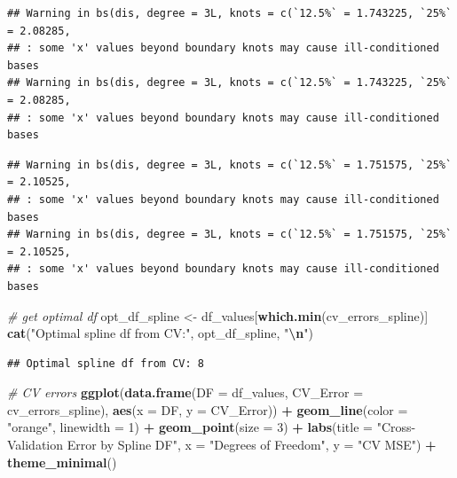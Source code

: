 \documentclass[
]{article}
\newenvironment{Shaded}{\begin{snugshade}}{\end{snugshade}}
\newcommand{\AttributeTok}[1]{\textcolor[rgb]{0.13,0.29,0.53}{#1}}
\newcommand{\CommentTok}[1]{\textcolor[rgb]{0.56,0.35,0.01}{\textit{#1}}}
\newcommand{\DecValTok}[1]{\textcolor[rgb]{0.00,0.00,0.81}{#1}}
\newcommand{\FunctionTok}[1]{\textcolor[rgb]{0.13,0.29,0.53}{\textbf{#1}}}
\newcommand{\NormalTok}[1]{#1}
\newcommand{\OtherTok}[1]{\textcolor[rgb]{0.56,0.35,0.01}{#1}}
\newcommand{\SpecialCharTok}[1]{\textcolor[rgb]{0.81,0.36,0.00}{\textbf{#1}}}
\newcommand{\StringTok}[1]{\textcolor[rgb]{0.31,0.60,0.02}{#1}}
\begin{document}
\begin{verbatim}
## Warning in bs(dis, degree = 3L, knots = c(`12.5%` = 1.743225, `25%` = 2.08285,
## : some 'x' values beyond boundary knots may cause ill-conditioned bases
## Warning in bs(dis, degree = 3L, knots = c(`12.5%` = 1.743225, `25%` = 2.08285,
## : some 'x' values beyond boundary knots may cause ill-conditioned bases
\end{verbatim}

\begin{verbatim}
## Warning in bs(dis, degree = 3L, knots = c(`12.5%` = 1.751575, `25%` = 2.10525,
## : some 'x' values beyond boundary knots may cause ill-conditioned bases
## Warning in bs(dis, degree = 3L, knots = c(`12.5%` = 1.751575, `25%` = 2.10525,
## : some 'x' values beyond boundary knots may cause ill-conditioned bases
\end{verbatim}

\begin{Shaded}
\begin{Highlighting}[]
\CommentTok{\# get optimal df}
\NormalTok{opt\_df\_spline }\OtherTok{\textless{}{-}}\NormalTok{ df\_values[}\FunctionTok{which.min}\NormalTok{(cv\_errors\_spline)]}
\FunctionTok{cat}\NormalTok{(}\StringTok{"Optimal spline df from CV:"}\NormalTok{, opt\_df\_spline, }\StringTok{"}\SpecialCharTok{\textbackslash{}n}\StringTok{"}\NormalTok{)}
\end{Highlighting}
\end{Shaded}

\begin{verbatim}
## Optimal spline df from CV: 8
\end{verbatim}

\begin{Shaded}
\begin{Highlighting}[]
\CommentTok{\#  CV errors}
\FunctionTok{ggplot}\NormalTok{(}\FunctionTok{data.frame}\NormalTok{(}\AttributeTok{DF =}\NormalTok{ df\_values, }\AttributeTok{CV\_Error =}\NormalTok{ cv\_errors\_spline), }
       \FunctionTok{aes}\NormalTok{(}\AttributeTok{x =}\NormalTok{ DF, }\AttributeTok{y =}\NormalTok{ CV\_Error)) }\SpecialCharTok{+}
  \FunctionTok{geom\_line}\NormalTok{(}\AttributeTok{color =} \StringTok{"orange"}\NormalTok{, }\AttributeTok{linewidth =} \DecValTok{1}\NormalTok{) }\SpecialCharTok{+}
  \FunctionTok{geom\_point}\NormalTok{(}\AttributeTok{size =} \DecValTok{3}\NormalTok{) }\SpecialCharTok{+}
  \FunctionTok{labs}\NormalTok{(}\AttributeTok{title =} \StringTok{"Cross{-}Validation Error by Spline DF"}\NormalTok{,}
       \AttributeTok{x =} \StringTok{"Degrees of Freedom"}\NormalTok{,}
       \AttributeTok{y =} \StringTok{"CV MSE"}\NormalTok{) }\SpecialCharTok{+}
  \FunctionTok{theme\_minimal}\NormalTok{()}
\end{Highlighting}
\end{Shaded}
\end{document}
